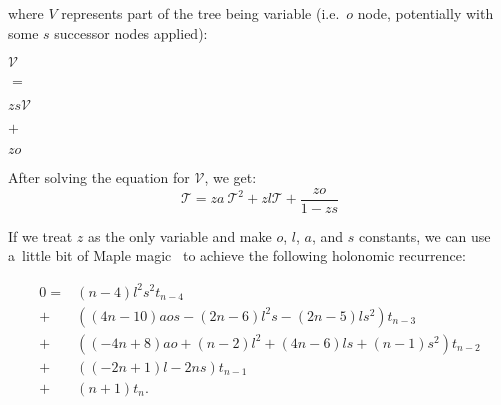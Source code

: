 \documentclass[final]{article}
\theoremstyle{definition}
\theoremstyle{definition}
\theoremstyle{remark}
\newcommand{\gf}[1]{\ensuremath{\mathcal{#1}}}
\begin{document}
where \(V\) represents part of the tree being variable (i.e.~\(o\) node, potentially with some \(s\) successor nodes applied):

\begin{center}
    \begin{minipage}[t]{.2\textwidth}
        \begin{center}
            \(\gf{V}\)\\
        \end{center}
    \end{minipage}%
    \begin{minipage}[t]{.05\textwidth}
        \begin{center}
            \(=\)\\
        \end{center}
    \end{minipage}%
    \begin{minipage}[t]{.2\textwidth}
        \begin{center}
            \(z s \gf{V}\)\\
        \end{center}
    \end{minipage}%
    \begin{minipage}[t]{.05\textwidth}
        \begin{center}
            \(+\)\\
        \end{center}
    \end{minipage}%
    \begin{minipage}[t]{.2\textwidth}
        \begin{center}
            \(z o\)\\
        \end{center}
    \end{minipage}%
\end{center}

After solving the equation for \(\gf{V}\), we get:
\[\gf{T} = z a~\gf{T}^2 + z l \gf{T} + \frac{z o}{1 - z s}\]

If we treat \(z\) as the only variable and make \(o\), \(l\), \(a\), and \(s\) constants, we can use a~little bit of Maple magic~\cite{gfun} to achieve the following holonomic recurrence:

\[\begin{array}{rl}
        0 =& (n - 4) l^2 s^2 t_{n - 4}\\
        +& ((4 n - 10) a o s - (2 n - 6) l^2 s - (2 n - 5) l s^2) t_{n - 3}\\
        +& ((-4 n + 8) a o + (n - 2) l^2 + (4 n - 6) l s + (n - 1) s^2) t_{n - 2}\\
        +& ((-2 n + 1) l - 2 n s) t_{n - 1}\\
        +& (n + 1) t_{n}.
\end{array}\]
\end{document}
